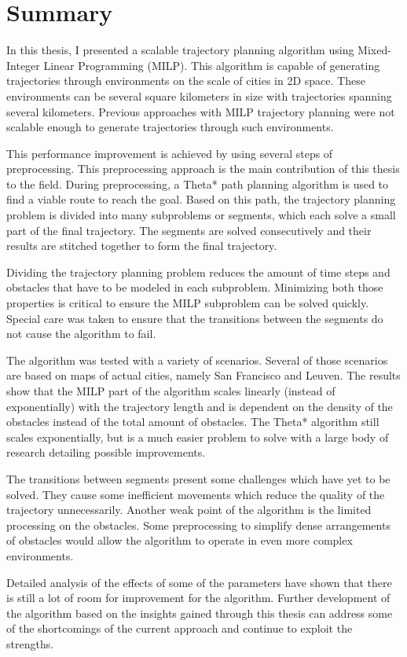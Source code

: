 \section{Summary}
In this thesis, I presented a scalable trajectory planning algorithm using Mixed-Integer Linear Programming (MILP). This algorithm is capable of generating trajectories through environments on the scale of cities in 2D space. These environments can be several square kilometers in size with trajectories spanning several kilometers. Previous approaches with MILP trajectory planning were not scalable enough to generate trajectories through such environments.
\par
This performance improvement is achieved by using several steps of preprocessing. This preprocessing approach is the main contribution of this thesis to the field. During preprocessing, a Theta* path planning algorithm is used to find a viable route to reach the goal. Based on this path, the trajectory planning problem is divided into many subproblems or segments, which each solve a small part of the final trajectory. The segments are solved consecutively and their results are stitched together to form the final trajectory.
\par
Dividing the trajectory planning problem reduces the amount of time steps and obstacles that have to be modeled in each subproblem. Minimizing both those properties is critical to ensure the MILP subproblem can be solved quickly. Special care was taken to ensure that the transitions between the segments do not cause the algorithm to fail.
\par
The algorithm was tested with a variety of scenarios. Several of those scenarios are based on maps of actual cities, namely San Francisco and Leuven. The results show that the MILP part of the algorithm scales linearly (instead of exponentially) with the trajectory length and is dependent on the density of the obstacles instead of the total amount of obstacles. The Theta* algorithm still scales exponentially, but is a much easier problem to solve with a large body of research detailing possible improvements.
\par
The transitions between segments present some challenges which have yet to be solved. They cause some inefficient movements which reduce the quality of the trajectory unnecessarily. Another weak point of the algorithm is the limited processing on the obstacles. Some preprocessing to simplify dense arrangements of obstacles would allow the algorithm to operate in even more complex environments.
\par
Detailed analysis of the effects of some of the parameters have shown that there is still a lot of room for improvement for the algorithm. Further development of the algorithm based on the insights gained through this thesis can address some of the shortcomings of the current approach and continue to exploit the strengths.

